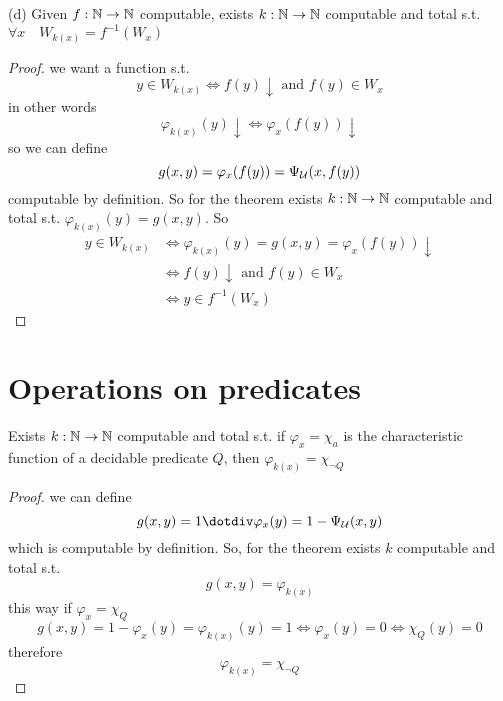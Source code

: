 (d) Given $f : \mathbb{N} \to \mathbb{N}$ computable, exists $k : \mathbb{N} \to \mathbb{N}$
computable and total s.t. $\forall x \quad W_{k(x)} = f^{-1}(W_x)$
\begin{proof}
  we want a function s.t.
  \[y \in W_{k(x)} \Leftrightarrow f(y) \downarrow \mbox{ and } f(y)
    \in W_x \]
  in other words
  \[\varphi_{k(x)}(y) \downarrow \Leftrightarrow \varphi_x(f(y))
    \downarrow\]
  so we can define
  \[g(x,y) = \varphi_x(f(y)) = \Psi_{\mathcal{U}}(x, f(y))\] computable by
  definition. So for the \smn theorem exists $k: \mathbb{N} \to \mathbb{N}$ computable
  and total s.t. \(\varphi_{k(x)}(y) = g(x,y)\). So
  \[
    \begin{split}
      y \in W_{k(x)} & \Leftrightarrow \varphi_{k(x)}(y) = g(x,y) = \varphi_x(f(y)) \downarrow \\
      & \Leftrightarrow f(y)\downarrow \mbox{ and } f(y) \in W_x \\
      & \Leftrightarrow y \in f^{-1}(W_x)
    \end{split}
  \]
\end{proof}

\section{Operations on predicates}
Exists $k : \mathbb{N} \to \mathbb{N}$ computable and total s.t. if
$\varphi_x = \chi_a$ is the characteristic function of a decidable
predicate $Q$, then $\varphi_{k(x)} = \chi_{\neg Q}$
\begin{proof}
  we can define \[g(x,y) = 1 \dotdiv \varphi_x(y) = 1 - \univ(x,y) \]
  which is computable by definition. So, for the \smn theorem exists
  $k$ computable and total s.t. \[g(x,y) = \varphi_{k(x)}\] this way
  if $\varphi_x = \chi_Q$
  \[
    g(x,y) = 1-\varphi_x(y) = \varphi_{k(x)}(y) = 1 \Leftrightarrow
    \varphi_x(y) = 0 \Leftrightarrow \chi_Q(y) = 0
  \]
  therefore
  \[
    \varphi_{k(x)} = \chi_{\neg Q}
  \]
\end{proof}
